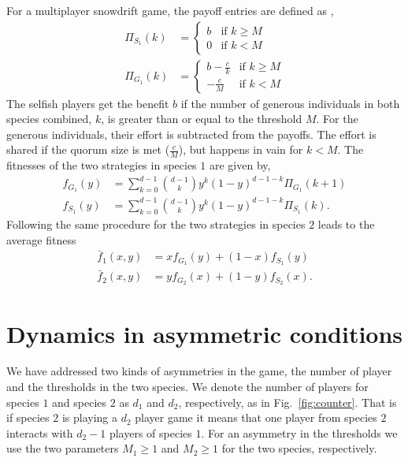 \documentclass[a4paper]{scrartcl}
\begin{document}
For a multiplayer snowdrift game, the payoff entries are defined as \citep{souza:2009aa},
\begin{align}
\Pi_{S_1} (k) & = \begin{cases} b & \textrm{if } k \geq M \\ 0 & \textrm{if } k < M \end{cases}
\\
\Pi_{G_1} (k) & = \begin{cases} b-\frac{c}{k} & \textrm{if } k \geq M \\  -\frac{c}{M} & \textrm{if } k < M \end{cases}
\end{align}
%
The selfish players get the benefit $b$ if the number of generous individuals in both species combined, $k$, is greater than or equal to the threshold $M$.
For the generous individuals, their effort is subtracted from the payoffs.
The effort is shared if the quorum size is met ($\frac{c}{M}$), but happens in vain for $k<M$. 
The fitnesses of the two strategies in species $1$ are given by,
%
\begin{align}
f_{G_1} (y) &= \sum_{k=0}^{d-1} \binom{d-1}{k}y^k (1-y)^{d-1-k} \Pi_{G_1}(k+1) \\
f_{S_1} (y) &= \sum_{k=0}^{d-1} \binom{d-1}{k}y^k (1-y)^{d-1-k} \Pi_{S_1}(k).
\label{fiteqs}
\end{align}
%
Following the same procedure for the two strategies in species $2$ leads to the average fitness
%
\begin{align}
\bar{f}_1 (x,y) &= x f_{G_1} (y)+(1-x) f_ {S_1}(y)\\
\bar{f}_2 (x,y) &= y f_{G_2} (x)+(1-y) f_{S_2}(x).
\label{avgfiteqs}
\end{align}
%

\section*{Dynamics in asymmetric conditions}

We have addressed two kinds of asymmetries in the game, the number of player and the thresholds in the two species.
We denote the number of players for species $1$ and species $2$ as $d_1$ and $d_2$, respectively, as in Fig.\ \ref{fig:counter}.
That is if species $2$ is playing a $d_2$ player game it means that one player from species $2$ interacts with $d_2-1$ players of species $1$.
For an asymmetry in the thresholds we use the two parameters $M_1\geq1$ and $M_2\geq1$ for the two species, respectively.
\end{document}
